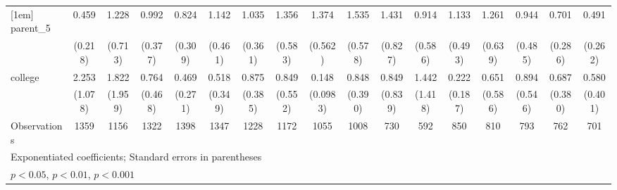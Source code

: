 {\begin{tabular}{l*{16}{c}}
[1em]
parent\_5            &       0.459         &       1.228         &       0.992         &       0.824         &       1.142         &       1.035         &       1.356         &       1.374         &       1.535         &       1.431         &       0.914         &       1.133         &       1.261         &       0.944         &       0.701         &       0.491         \\
                    &     (0.218)         &     (0.713)         &     (0.377)         &     (0.309)         &     (0.461)         &     (0.361)         &     (0.583)         &     (0.562)         &     (0.578)         &     (0.827)         &     (0.586)         &     (0.493)         &     (0.639)         &     (0.485)         &     (0.286)         &     (0.262)         \\
[1em]
college             &       2.253         &       1.822         &       0.764         &       0.469         &       0.518         &       0.875         &       0.849         &       0.148\sym{**} &       0.848         &       0.849         &       1.442         &       0.222         &       0.651         &       0.894         &       0.687         &       0.580         \\
                    &     (1.078)         &     (1.959)         &     (0.468)         &     (0.271)         &     (0.349)         &     (0.385)         &     (0.552)         &    (0.0983)         &     (0.390)         &     (0.839)         &     (1.418)         &     (0.187)         &     (0.586)         &     (0.546)         &     (0.380)         &     (0.401)         \\
\hline
Observations        &        1359         &        1156         &        1322         &        1398         &        1347         &        1228         &        1172         &        1055         &        1008         &         730         &         592         &         850         &         810         &         793         &         762         &         701         \\
\hline\hline
\multicolumn{17}{l}{\footnotesize Exponentiated coefficients; Standard errors in parentheses}\\
\multicolumn{17}{l}{\footnotesize \sym{*} \(p<0.05\), \sym{**} \(p<0.01\), \sym{***} \(p<0.001\)}\\
\end{tabular}
}
